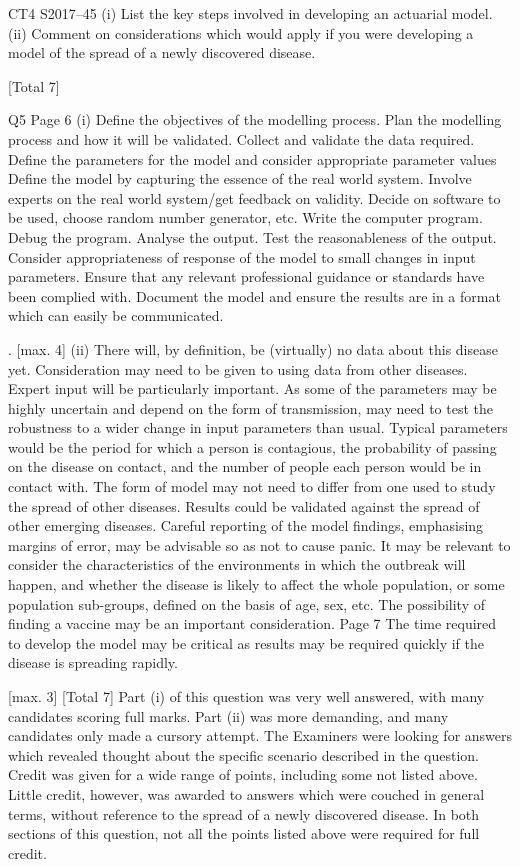 \documentclass[a4paper,12pt]{article}
\begin{document}
CT4 S2017–45
(i) List the key steps involved in developing an actuarial model.
(ii) Comment on considerations which would apply if you were developing a
model of the spread of a newly discovered disease.

[Total 7]



Q5
Page 6
(i)
Define the objectives of the modelling process. 
Plan the modelling process and how it will be validated. 
Collect and validate the data required. 
Define the parameters for the model and consider appropriate parameter
values 
Define the model by capturing the essence of the real world system. 
Involve experts on the real world system/get feedback on validity. %
Decide on software to be used, choose random number generator, etc. 
Write the computer program. 
Debug the program. 
Analyse the output. 
Test the reasonableness of the output. 
Consider appropriateness of response of the model to small changes in
input parameters. 
Ensure that any relevant professional guidance or standards have been
complied with. 
Document the model and ensure the results are in a format which can
easily be communicated.

.
[max. 4]
(ii)
There will, by definition, be (virtually) no data about this disease yet. 
Consideration may need to be given to using data from other diseases. 
Expert input will be particularly important. 
As some of the parameters may be highly uncertain and depend
on the form of transmission, may need to test the robustness
to a wider change in input parameters than usual. %
Typical parameters would be the period for which a person is
contagious, the probability of passing on the disease on contact,
and the number of people each person would be in contact with. %
The form of model may not need to differ from one used to study the spread of other diseases. 
Results could be validated against the spread of other emerging diseases. 
Careful reporting of the model findings, emphasising margins of error, may be advisable so as not to cause panic. 
It may be relevant to consider the characteristics of the environments
in which the outbreak will happen, and whether the disease is likely to affect the whole population, or some population sub-groups,
defined on the basis of age, sex, etc. 
The possibility of finding a vaccine may be an important
consideration. 
Page 7%
The time required to develop the model may be critical as results may be
required quickly if the disease is spreading rapidly.

[max. 3]
[Total 7]
Part (i) of this question was very well answered, with many candidates
scoring full marks. Part (ii) was more demanding, and many
candidates only made a cursory attempt. The Examiners were looking for answers which revealed thought about the specific scenario
described in the question. Credit was given for a wide range of points,
including some not listed above. Little credit, however, was awarded
to answers which were couched in general terms, without reference to
the spread of a newly discovered disease. In both sections of this
question, not all the points listed above were required for full credit.
\end{document}
